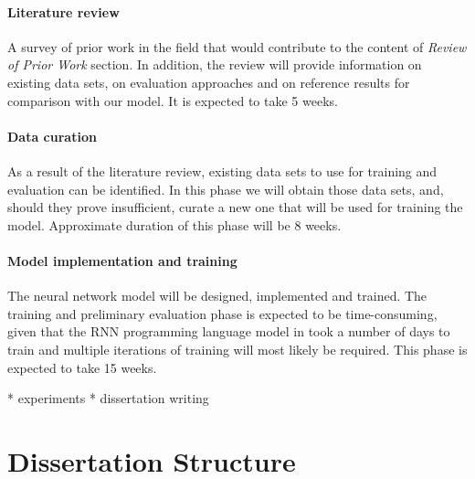 \documentclass[twoside,a4paper]{scrartcl}
\begin{document}
\paragraph{Literature review} A survey of prior work in the field that would contribute
to the content of \emph{Review of Prior Work} section. In addition, the review will 
provide information on existing data sets, on evaluation approaches and on reference 
results for comparison with our model. It is expected to take 5 weeks.

\paragraph{Data curation} As a result of the literature review, existing data sets
to use for training and evaluation can be identified. In this phase we will obtain
those data sets, and, should they prove insufficient, curate a new one that will be
used for training the model. Approximate duration of this phase will be 8 weeks.

\paragraph{Model implementation and training} The neural network model will be 
designed, implemented and trained. The training and preliminary evaluation phase 
is expected to be time-consuming, given that the RNN programming language model in 
\cite{karpathy2015unreasonable} took a number of days
to train and multiple iterations of training will most likely be required. This phase 
is expected to take 15 weeks.


* experiments
* dissertation writing


\section{Dissertation Structure}
\end{document}

